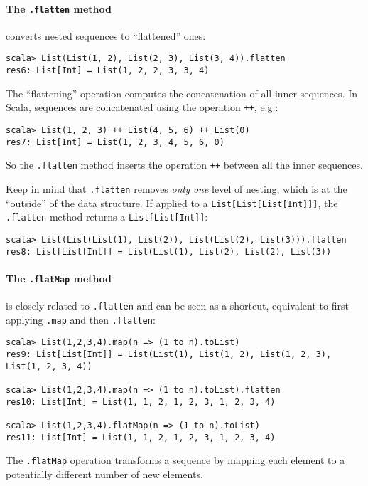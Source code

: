 \paragraph*{The \lstinline!.flatten!
method}

converts nested sequences to ``flattened'' ones:
\begin{lstlisting}
scala> List(List(1, 2), List(2, 3), List(3, 4)).flatten
res6: List[Int] = List(1, 2, 2, 3, 3, 4)
\end{lstlisting}
The ``flattening'' operation computes the concatenation of all inner
sequences. In Scala, sequences are concatenated using the operation
\lstinline!++!, e.g.:
\begin{lstlisting}
scala> List(1, 2, 3) ++ List(4, 5, 6) ++ List(0)
res7: List[Int] = List(1, 2, 3, 4, 5, 6, 0)
\end{lstlisting}
So the \lstinline!.flatten!
method inserts the operation \lstinline!++!
between all the inner sequences.

Keep in mind that \lstinline!.flatten!
removes \emph{only one} level of nesting, which is at the ``outside''
of the data structure. If applied to a \lstinline!List[List[List[Int]]]!,
the \lstinline!.flatten!
method returns a \lstinline!List[List[Int]]!:
\begin{lstlisting}
scala> List(List(List(1), List(2)), List(List(2), List(3))).flatten
res8: List[List[Int]] = List(List(1), List(2), List(2), List(3))
\end{lstlisting}

\paragraph*{The \lstinline!.flatMap!
method}

is closely related to \lstinline!.flatten!
and can be seen as a shortcut, equivalent to first applying \lstinline!.map!
and then \lstinline!.flatten!:
\begin{lstlisting}
scala> List(1,2,3,4).map(n => (1 to n).toList)
res9: List[List[Int]] = List(List(1), List(1, 2), List(1, 2, 3), List(1, 2, 3, 4))

scala> List(1,2,3,4).map(n => (1 to n).toList).flatten
res10: List[Int] = List(1, 1, 2, 1, 2, 3, 1, 2, 3, 4)

scala> List(1,2,3,4).flatMap(n => (1 to n).toList)
res11: List[Int] = List(1, 1, 2, 1, 2, 3, 1, 2, 3, 4)
\end{lstlisting}
The \lstinline!.flatMap!
operation transforms a sequence by mapping each element to a potentially
different number of new elements.


